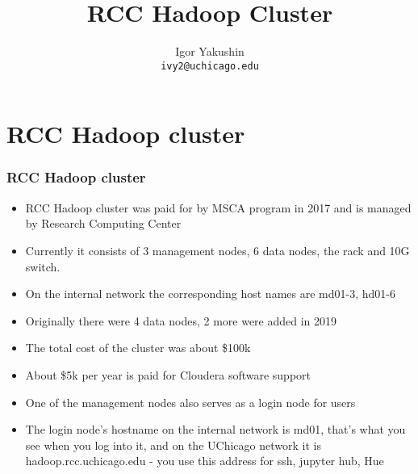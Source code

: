 \documentclass{beamer}
\title{\huge{RCC Hadoop Cluster}}
\author{Igor Yakushin \\ \texttt{ivy2@uchicago.edu}}
\date{}
\begin{document}



\begin{frame}
\titlepage
\end{frame}




\section{RCC Hadoop cluster}
\begin{frame}
  \frametitle{RCC Hadoop cluster}
  \begin{itemize}
  \item RCC Hadoop cluster was paid for by MSCA program in 2017 and is managed by Research Computing Center
  \item Currently it consists of 3 management nodes, 6 data nodes, the rack and 10G switch.
  \item On the internal network the corresponding host names are {\color{mycolorcli}md01-3}, {\color{mycolorcli}hd01-6}
  \item Originally there were 4 data nodes, 2 more were added in 2019
  \item The total cost of the cluster was about \$100k
  \item About \$5k per year is paid for Cloudera software support
  \item One of the management nodes also serves as a login node for users
  \item The login node's hostname on the internal network is {\color{mycolorcli}md01}, that's what you see when you log into it,
    and on the UChicago network it is {\color{mycolorcli}hadoop.rcc.uchicago.edu} - you use this address for ssh, jupyter hub, Hue
  \end{itemize} 
\end{frame}
\end{document}
